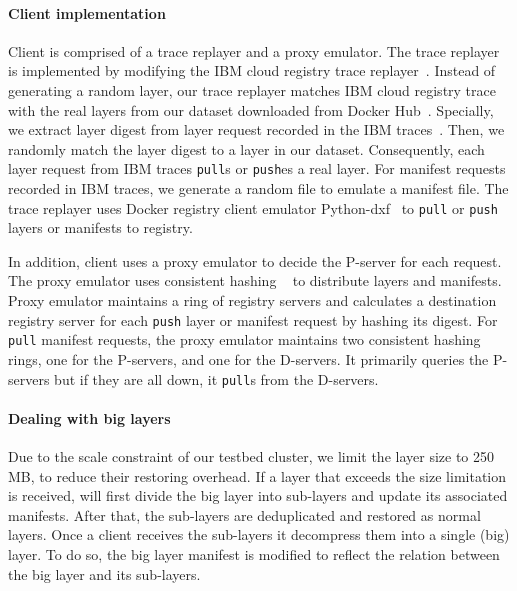 
\paragraph{Client implementation}
Client is comprised of a trace replayer and a proxy emulator.
The trace replayer is implemented by modifying the IBM cloud registry trace replayer~\cite{dockerworkload}.
Instead of generating a random layer,
our trace replayer matches IBM cloud registry trace with
the real layers from our dataset downloaded from Docker Hub~\cite{dedupanalysis}.
Specially, we extract layer digest from layer request recorded in the IBM traces~\cite{dockerworkload}.
Then, 
we randomly match the layer digest to a layer in our dataset. 
Consequently, each layer request from IBM traces \texttt{pull}s or \texttt{push}es a real layer.
For manifest requests recorded in IBM traces, we generate a random file to emulate a manifest file.
The trace replayer uses Docker registry client emulator Python-dxf~\cite{pydxf} to 
\texttt{pull} or \texttt{push} layers or manifests to registry.

In addition, client uses a proxy emulator to decide %
the P-server for each request.
The proxy emulator uses
consistent hashing ~\cite{kargercons} to distribute layers and manifests.
Proxy emulator maintains a ring of registry servers
and calculates a destination registry server for each \texttt{push} layer or manifest request
 by hashing its digest. For \texttt{pull} manifest requests, the proxy emulator maintains two consistent hashing rings, one for the P-servers, and one for the D-servers. It primarily queries the P-servers but if they are all down, it \texttt{pull}s from the D-servers.

\paragraph{Dealing with big layers}
Due to the scale constraint of our testbed cluster, we limit the layer size
to 250 MB, to reduce their restoring overhead.
If a layer that exceeds the size limitation is received,
\sysname will first divide the big layer into sub-layers and update its associated manifests.
After that,
the sub-layers are deduplicated and restored as normal layers.
Once a client receives the sub-layers it decompress them into a single (big) layer.
To do so, the big layer manifest is modified to reflect the relation
between the big layer and its sub-layers.

